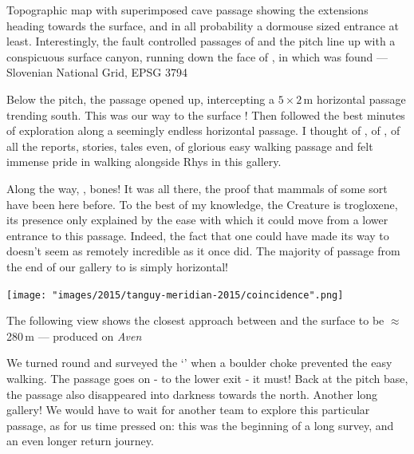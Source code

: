 \begin{map}[t!]
\caption[Meridian way topographic map]{Topographic map with superimposed cave passage showing the \protect{} extensions heading towards the surface, and in all probability a dormouse sized entrance at least. Interestingly, the fault controlled passages of \protect{} and the \protect{} pitch line up with a conspicuous surface canyon, running down the face of \protect{}, in which \protect{} was found --- Slovenian National Grid, EPSG 3794}
\label{map:meridianmap}
\end{map}


Below the pitch, the passage opened up, intercepting a $5\times2$\,m horizontal passage trending south. This was our way to the surface ! Then followed the best minutes of exploration along a seemingly endless horizontal passage. I thought of , of , of all the reports, stories, tales even, of glorious easy walking passage and felt immense pride in walking alongside Rhys in this gallery.

Along the way, , bones! It was all there, the proof that mammals of some sort have been here before. To the best of my knowledge, the Creature is trogloxene, its presence only explained by the ease with which it could move from a lower entrance to this passage. Indeed, the fact that one could have made its way to  doesn't seem as remotely incredible as it once did. The majority of passage from the end of our gallery to  is simply horizontal!

\begin{survey*}[t!]
\checkoddpage \ifoddpage \forcerectofloat \else \forceversofloat \fi
\texttt{[image: "images/2015/tanguy-meridian-2015/coincidence".png]}
\caption[Aven view of Empty Quarter]{The following view shows the closest approach between \protect{} and the surface to be $\approx$280\,m --- produced on \emph{Aven}}
\end{survey*}

We turned round and surveyed the `' when a boulder choke prevented the easy walking. The passage goes on - to the lower exit - it must! Back at the pitch base, the passage also disappeared into darkness towards the north. Another long gallery! We would have to wait for another team to explore this particular passage, as for us time pressed on: this was the beginning of a long survey, and an even longer return journey.

